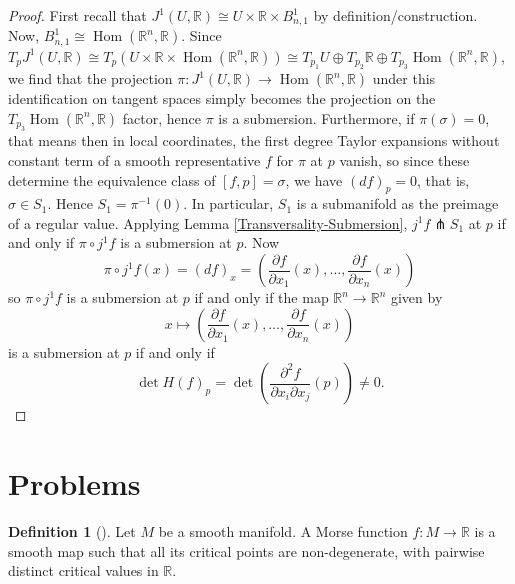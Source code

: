 \documentclass[reqno]{amsart}
\theoremstyle{definition}
\newtheorem{definition}[theorem]{Definition}
\theoremstyle{remark}
\DeclareMathOperator{\Hom}{Hom}
\begin{document}
 \begin{proof}
     First recall that
     $J^{1}(U,\mathbb{R}) \cong
     U \times \mathbb{R} \times B_{n,1}^{1}$ by
     definition/construction. Now,
     $B_{n,1}^{1} \cong
     \Hom \left( \mathbb{R}^{n},\mathbb{R} \right) $.
     Since
     $T_p J^{1}(U,\mathbb{R}) \cong
     T_{p} \left( U \times \mathbb{R} \times
     \Hom \left( \mathbb{R}^{n},\mathbb{R} \right) \right)
     \cong T_{p_1}U \oplus
     T_{p_2} \mathbb{R} \oplus
     T_{p_3} \Hom\left( \mathbb{R}^{n},\mathbb{R} \right) $,
     we find that the projection
     $\pi \colon J^{1}\left( U,\mathbb{R} \right)
     \to \Hom \left( \mathbb{R}^{n},\mathbb{R} \right) $
     under this identification on tangent spaces
     simply becomes the projection on the
     $T_{p_3}\Hom \left( \mathbb{R}^{n},\mathbb{R} \right) $
     factor, hence $\pi$ is a submersion.
     Furthermore,
     if $\pi (\sigma) = 0$, that means then
     in local coordinates, the first degree
     Taylor expansions without constant term
     of a smooth representative  $f$ for $\pi$ at
     $p$ vanish, so since these determine
     the equivalence class of $\left[ f,p \right] =
     \sigma$, we
     have  $(df)_p = 0$, that is, $\sigma
     \in S_1$.
     Hence $S_1 = \pi^{-1}(0)$. In particular,
     $S_1$ is a submanifold as the preimage of a
     regular value.
     Applying Lemma \ref{Transversality-Submersion},
     $j^{1}f \pitchfork S_1$ at $p$ if and only if
     $\pi \circ j^{1} f$ is a submersion at $p$.
     Now \[
     \pi \circ j^{1} f(x) =
     \left( df \right)_x
     =
     \left( \frac{\partial f}{\partial x_1}(x),
     \ldots, \frac{\partial f}{\partial x_n}(x)\right)
     \]
     so $\pi \circ j^{1}f$ is a submersion at $p$ if
     and only if
     the map
     $\mathbb{R}^{n} \to \mathbb{R}^{n}$
     given by
     \[
     x\mapsto \left( \frac{\partial f}{\partial x_1}(x),
     \ldots, \frac{\partial f}{\partial x_n}(x)\right)
     \] is a submersion at $p$ if and only if
     \[
     \det H (f)_p = \det \left( \frac{\partial^2 f}{
     \partial x_i \partial x_j} (p) \right) \neq 0.
     \]
 \end{proof}


\section{Problems}

\begin{definition}[]
    Let $M$ be a smooth manifold. A Morse function
    $f \colon M \to \mathbb{R}$ is a smooth map such that
    all its critical points are non-degenerate, with
    pairwise distinct critical values in $\mathbb{R}$.
\end{definition}
\end{document}
